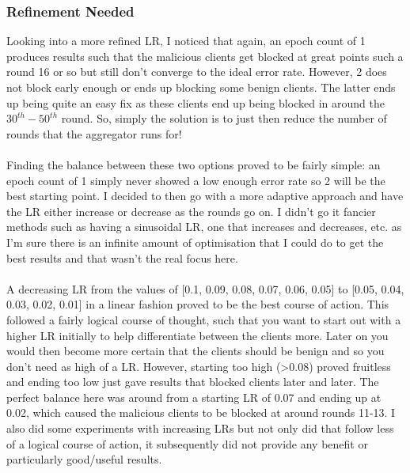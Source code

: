 \subsubsection{Refinement Needed}
Looking into a more refined LR, I noticed that again, an epoch count of 1 produces results such that the malicious clients get blocked at great points such a round 16 or so but still don't converge to the ideal error rate.
However, 2 does not block early enough or ends up blocking some benign clients.
The latter ends up being quite an easy fix as these clients end up being blocked in around the $ 30^{th}-50^{th} $ round.
So, simply the solution is to just then reduce the number of rounds that the aggregator runs for!
\\ \\
Finding the balance between these two options proved to be fairly simple: an epoch count of 1 simply never showed a low enough error rate so 2 will be the best starting point.
I decided to then go with a more adaptive approach and have the LR either increase or decrease as the rounds go on.
I didn't go it fancier methods such as having a sinusoidal LR, one that increases and decreases, etc. as I'm sure there is an infinite amount of optimisation that I could do to get the best results and that wasn't the real focus here.
\\ \\ 
A decreasing LR from the values of [0.1, 0.09, 0.08, 0.07, 0.06, 0.05] to [0.05, 0.04, 0.03, 0.02, 0.01] in a linear fashion proved to be the best course of action.
This followed a fairly logical course of thought, such that you want to start out with a higher LR initially to help differentiate between the clients more.
Later on you would then become more certain that the clients should be benign and so you don't need as high of a LR.
However, starting too high (>0.08) proved fruitless and ending too low just gave results that blocked clients later and later.
The perfect balance here was around from a starting LR of 0.07 and ending up at 0.02, which caused the malicious clients to be blocked at around rounds 11-13.
I also did some experiments with increasing LRs but not only did that follow less of a logical course of action, it subsequently did not provide any benefit or particularly good/useful results.

